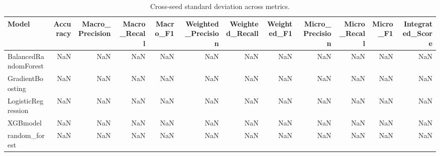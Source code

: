 \begin{table}[t]
\centering
\begin{tabular}{lrrrrrrrrrrr}
\toprule
Model & Accuracy & Macro_Precision & Macro_Recall & Macro_F1 & Weighted_Precision & Weighted_Recall & Weighted_F1 & Micro_Precision & Micro_Recall & Micro_F1 & Integrated_Score \\
\midrule
BalancedRandomForest & NaN & NaN & NaN & NaN & NaN & NaN & NaN & NaN & NaN & NaN & NaN \\
GradientBoosting & NaN & NaN & NaN & NaN & NaN & NaN & NaN & NaN & NaN & NaN & NaN \\
LogisticRegression & NaN & NaN & NaN & NaN & NaN & NaN & NaN & NaN & NaN & NaN & NaN \\
XGBmodel & NaN & NaN & NaN & NaN & NaN & NaN & NaN & NaN & NaN & NaN & NaN \\
random_forest & NaN & NaN & NaN & NaN & NaN & NaN & NaN & NaN & NaN & NaN & NaN \\
\bottomrule
\end{tabular}
\caption{Cross-seed standard deviation across metrics.}
\label{tab:cross_seed_std}
\end{table}